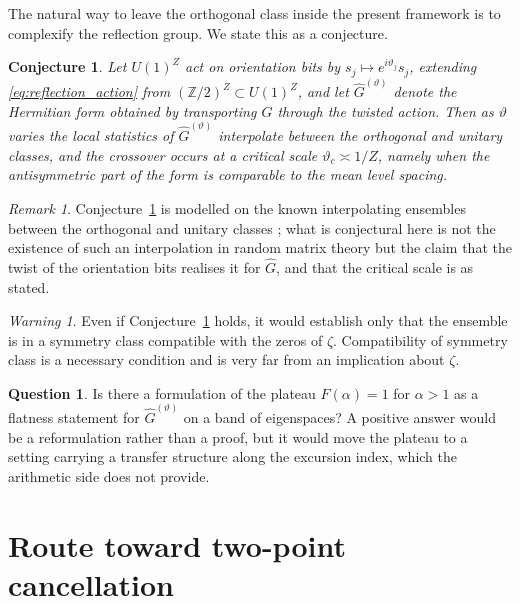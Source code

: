 \documentclass[11pt]{amsart}
\numberwithin{equation}{section}
\theoremstyle{plain}
\newtheorem{conjecture}[theorem]{Conjecture}
\theoremstyle{definition}
\newtheorem{question}[theorem]{Question}
\theoremstyle{remark}
\newtheorem{remark}[theorem]{Remark}
\newtheorem{warning}[theorem]{Warning}
\begin{document}
The natural way to leave the orthogonal class inside the present
framework is to complexify the reflection group. We state this as a
conjecture.

\begin{conjecture}
\label{conj:twisted_orientation_bits}
Let $U(1)^Z$ act on orientation bits by
$s_j \mapsto e^{i\vartheta_j} s_j$, extending
\eqref{eq:reflection_action} from
$(\mathbb{Z}/2)^Z \subset U(1)^Z$, and let
$\widehat{G}^{(\vartheta)}$ denote the Hermitian form obtained by
transporting $G$ through the twisted action. Then as $\vartheta$ varies
the local statistics of $\widehat{G}^{(\vartheta)}$ interpolate between
the orthogonal and unitary classes, and the crossover occurs at a
critical scale $\vartheta_c \asymp 1/Z$, namely when the
antisymmetric part of the form is comparable to the mean level spacing.
\end{conjecture}

\begin{remark}
\label{rem:pandey_mehta}
Conjecture~\ref{conj:twisted_orientation_bits} is modelled on the
known interpolating ensembles between the orthogonal and unitary
classes \cite{PandeyMehta1983}; what is conjectural here is not the
existence of such an interpolation in random matrix theory but the
claim that the twist of the orientation bits realises it for
$\widehat{G}$, and that the critical scale is as stated.
\end{remark}

\begin{warning}
\label{warn:crossover_is_necessary_not_sufficient}
Even if Conjecture~\ref{conj:twisted_orientation_bits} holds, it would
establish only that the ensemble is in a symmetry class compatible with
the zeros of $\zeta$. Compatibility of symmetry class is a necessary
condition and is very far from an implication about
$\zeta$.
\end{warning}

\begin{question}
\label{q:plateau_as_flatness}
Is there a formulation of the plateau $F(\alpha) = 1$ for $\alpha > 1$
as a flatness statement for $\widehat{G}^{(\vartheta)}$ on a band of
eigenspaces? A positive answer would be a reformulation rather than a
proof, but it would move the plateau to a setting carrying a transfer
structure along the excursion index, which the arithmetic side does not
provide.
\end{question}

\section{Route toward two-point cancellation}
\label{sec:two_point}
\end{document}
